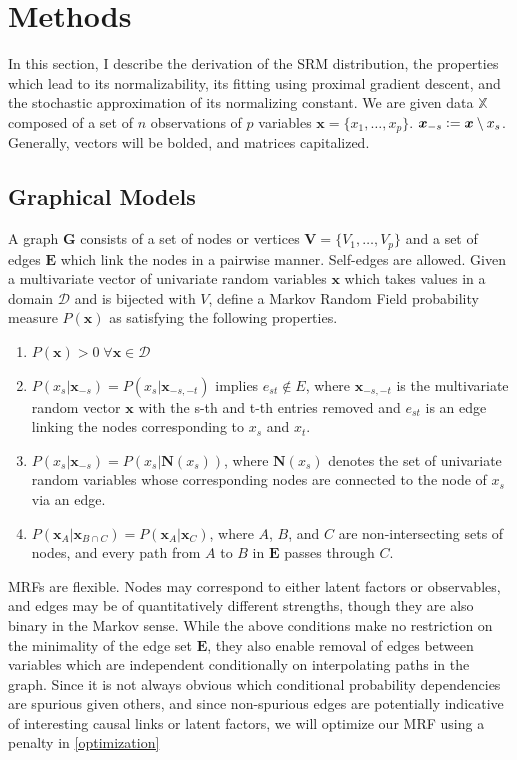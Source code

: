 \documentclass{samkoelleprelimworking}
\begin{document}
\section{Methods}

In this section, I describe the derivation of the SRM distribution, the properties which lead to its normalizability, its fitting using proximal gradient descent, and the stochastic approximation of its normalizing constant.  We are given data $\mathbb{X}$ composed of a set of $n$ observations of $p$ variables $\bm{x} = \{x_1, \dotsc , x_p\}$.  $\bm{x}_{-s} \vcentcolon = \bm{x} \setminus x_s$. Generally, vectors will be bolded, and matrices capitalized.

 \subsection{Graphical Models}
 
A graph $\bm{G}$ consists of a set of nodes or vertices $\bm{V} = \{V_1, \dotsc , V_p \}$ and a set of edges $\bm{E}$ which link the nodes in a pairwise manner.  Self-edges are allowed.  Given a multivariate vector of univariate random variables $\bm{x}$ which takes values in a domain $\mathcal{D}$ and is bijected with $V$, define a Markov Random Field probability measure $P(\bm{x})$ as satisfying the following properties.
\begin{enumerate}
\item $P(\bm{x}) > 0 \; \forall \bm{x} \in \mathcal{D}$
\item $P(x_s \vert \bm{x}_{-s}) = P(x_s \vert \bm{x}_{-s,-t})$ implies $e_{st} \not\in E$, where $\bm{x}_{-s,-t}$ is the multivariate random vector $\bm{x}$ with the s-th and t-th entries removed and $e_{st}$ is an edge linking the nodes corresponding to $x_s$ and $x_t$.
\item $P(x_s \vert \bm{x}_{-s}) = P(x_s \vert \bm{N}(x_s))$, where $ \bm{N}(x_s)$ denotes the set of univariate random variables whose corresponding nodes are connected to the node of $x_s$ via an edge. 
\item $P(\bm{x}_A \vert \bm{x}_{B \cap C}) = P(\bm{x}_A \vert \bm{x}_C)$, where $A$, $B$, and $C$ are non-intersecting sets of nodes, and every path from $A$ to $B$ in $\bm{E}$ passes through $C$.
\end{enumerate}
MRFs are flexible.  Nodes may correspond to either latent factors or observables, and edges may be of quantitatively different strengths, though they are also binary in the Markov sense.  While the above conditions make no restriction on the minimality of the edge set $\bm{E}$, they also enable removal of edges between variables which are independent conditionally on interpolating paths in the graph.  Since it is not always obvious which conditional probability dependencies are spurious given others, and since non-spurious edges are potentially indicative of interesting causal links or latent factors, we will optimize our MRF using a penalty in \ref{optimization}
\end{document}
